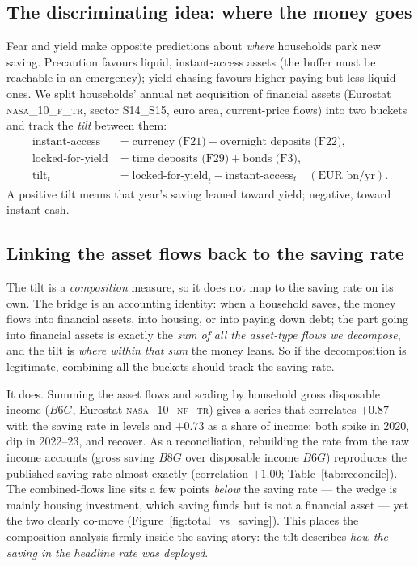 \documentclass[11pt,a4paper]{article}
\newcommand{\dataset}[1]{\textsc{#1}}
\begin{document}
\subsection{The discriminating idea: where the money goes}
Fear and yield make opposite predictions about \emph{where} households park new
saving. Precaution favours liquid, instant-access assets (the buffer must be
reachable in an emergency); yield-chasing favours higher-paying but less-liquid
ones. We split households' annual net acquisition of financial assets (Eurostat
\dataset{nasa\_10\_f\_tr}, sector S14\_S15, euro area, current-price flows) into
two buckets and track the \emph{tilt} between them:
\begin{align*}
\text{instant-access} &= \text{currency (F21)} + \text{overnight deposits (F22)},\\
\text{locked-for-yield} &= \text{time deposits (F29)} + \text{bonds (F3)},\\
\text{tilt}_t &= \text{locked-for-yield}_t - \text{instant-access}_t \quad(\text{EUR bn/yr}).
\end{align*}
A positive tilt means that year's saving leaned toward yield; negative, toward
instant cash.

\subsection{Linking the asset flows back to the saving rate}
The tilt is a \emph{composition} measure, so it does not map to the saving rate on
its own. The bridge is an accounting identity: when a household saves, the money
flows into financial assets, into housing, or into paying down debt; the part going
into financial assets is exactly the \emph{sum of all the asset-type flows we
decompose}, and the tilt is \emph{where within that sum} the money leans. So if the
decomposition is legitimate, combining all the buckets should track the saving
rate.

It does. Summing the asset flows and scaling by household gross disposable income
($B6G$, Eurostat \dataset{nasa\_10\_nf\_tr}) gives a series that correlates
$+0.87$ with the saving rate in levels and $+0.73$ as a share of income; both
spike in 2020, dip in 2022--23, and recover. As a reconciliation, rebuilding the
rate from the raw income accounts (gross saving $B8G$ over disposable income
$B6G$) reproduces the published saving rate almost exactly (correlation $+1.00$;
Table~\ref{tab:reconcile}). The combined-flows line sits a few points \emph{below}
the saving rate --- the wedge is mainly housing investment, which saving funds but
is not a financial asset --- yet the two clearly co-move
(Figure~\ref{fig:total_vs_saving}). This places the composition analysis firmly
inside the saving story: the tilt describes \emph{how the saving in the headline
rate was deployed}.
\end{document}
